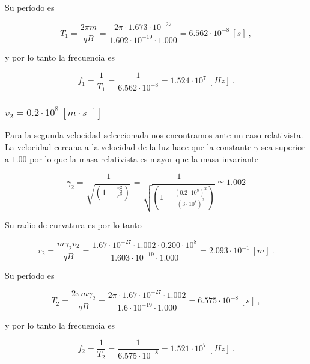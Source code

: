 \documentclass[journal]{IEEEtran}
\begin{document}
Su período es

\begin{equation}
T_1 = \displaystyle\frac{2\pi m}{qB} = \displaystyle\frac{2\pi \cdot 1.673\cdot 10^{-27}}{1.602\cdot 10^{-19}\cdot 1.000} = 6.562\cdot 10^{-8}~[s]~,
\end{equation}

y por lo tanto la frecuencia es

\begin{equation}
f_1 = \displaystyle\frac{1}{T_1} = \displaystyle\frac{1}{6.562\cdot 10^{-8}} = 1.524\cdot 10^7~[Hz]~.
\end{equation}

\subsubsection{$v_2 = 0.2\cdot 10^8~[m\cdot s^{-1}]$}

Para la segunda velocidad seleccionada nos encontramos ante un caso relativista. La velocidad cercana a la velocidad de la luz hace que la constante $\gamma$ sea superior a $1.00$ por lo que la masa relativista es mayor que la masa invariante 

\begin{equation}
\gamma_2 = \displaystyle\frac{1}{\sqrt{(1-\displaystyle\frac{v_2^2}{c^2})}} = \displaystyle\frac{1}{\sqrt{(1-\displaystyle\frac{(0.2\cdot 10^8)^2}{(3\cdot 10^8)^2})}} \simeq 1.002
\end{equation}

Su radio de curvatura es por lo tanto

\begin{equation}
r_2 = \displaystyle\frac{m\gamma_2v_2}{qB} = \displaystyle\frac{1.67\cdot 10^{-27}\cdot 1.002 \cdot 0.200\cdot 10^8}{1.603\cdot 10^{-19}\cdot 1.000} = 2.093\cdot 10^{-1}~[m]~.
\end{equation}

Su período es

\begin{equation}
T_2 = \displaystyle\frac{2\pi m\gamma_2}{qB} = \displaystyle\frac{2\pi \cdot 1.67\cdot 10^{-27}\cdot 1.002}{1.6\cdot 10^{-19}\cdot 1.000} = 6.575\cdot 10^{-8}~[s]~,
\end{equation}

y por lo tanto la frecuencia es

\begin{equation}
f_2 = \displaystyle\frac{1}{T_2} = \displaystyle\frac{1}{6.575\cdot 10^{-8}} = 1.521\cdot 10^7~[Hz]~.
\end{equation}
\end{document}
